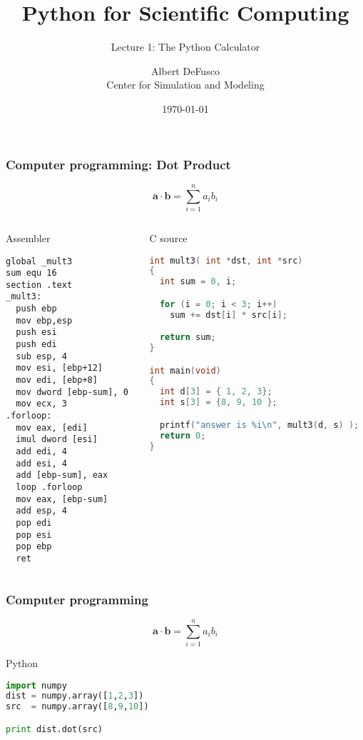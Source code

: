 \documentclass[xcolor=table,10pt,final]{beamer}
\begin{document}
\title{Python for Scientific Computing}
\subtitle{Lecture 1: The Python Calculator}
\author{Albert DeFusco\\Center for Simulation and Modeling}
\date{\today}
\frame{\titlepage}

\begin{frame}[fragile]
  \frametitle{Computer programming: Dot Product}
  {\scriptsize
  \begin{equation*}
    \mathbf{a}\cdot\mathbf{b} = \sum_{i=1}^{n}a_ib_i
  \end{equation*}
}
  \begin{columns}
    \begin{column}{0.5\paperwidth}
      \begin{block}{Assembler}
\lstset{
      basicstyle=\tiny
    }
  \begin{lstlisting}[language={[x86masm]Assembler}]
global _mult3
sum equ 16
section .text
_mult3:
  push ebp
  mov ebp,esp
  push esi
  push edi
  sub esp, 4
  mov esi, [ebp+12]
  mov edi, [ebp+8]
  mov dword [ebp-sum], 0
  mov ecx, 3
.forloop:
  mov eax, [edi]
  imul dword [esi]
  add edi, 4
  add esi, 4
  add [ebp-sum], eax
  loop .forloop
  mov eax, [ebp-sum]
  add esp, 4
  pop edi
  pop esi
  pop ebp
  ret
\end{lstlisting}
\end{block}
\end{column}
\begin{column}{0.35\paperwidth}
  \begin{block}{C source\footnotemark}
\lstset{
      basicstyle=\tiny
    }
  \begin{lstlisting}[language=C]
int mult3( int *dst, int *src)
{
  int sum = 0, i;

  for (i = 0; i < 3; i++)
    sum += dst[i] * src[i];

  return sum;
}

int main(void)
{
  int d[3] = { 1, 2, 3};
  int s[3] = {8, 9, 10 };

  printf("answer is %i\n", mult3(d, s) );
  return 0;
}
      \end{lstlisting}
    \end{block}
    \end{column}
  \end{columns}
  {\tiny {}}
\end{frame}
\begin{frame}[fragile]
  \frametitle{Computer programming}
  {\scriptsize
  \begin{equation*}
    \mathbf{a}\cdot\mathbf{b} = \sum_{i=1}^{n}a_ib_i
  \end{equation*}
}
\lstset{
      basicstyle=\footnotesize
    }
  \begin{block}{Python}
    \begin{lstlisting}[language=Python]
import numpy
dist = numpy.array([1,2,3])
src  = numpy.array([8,9,10])

print dist.dot(src)
\end{lstlisting}
\end{block}
\end{frame}
\end{document}
